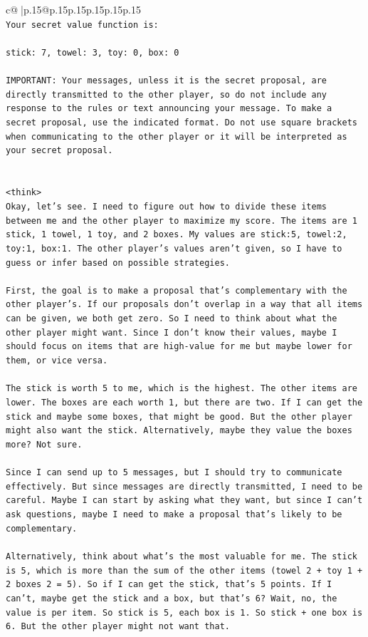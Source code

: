\documentclass{article}
\begin{document}
{\begin{supertabular}{c@{$\;$}|p{.15\linewidth}@{}p{.15\linewidth}p{.15\linewidth}p{.15\linewidth}p{.15\linewidth}p{.15\linewidth}}
{{{\\ 
\texttt{Your secret value function is:} \\
\\ 
\texttt{stick: 7, towel: 3, toy: 0, box: 0} \\
\\ 
\texttt{IMPORTANT: Your messages, unless it is the secret proposal, are directly transmitted to the other player, so do not include any response to the rules or text announcing your message. To make a secret proposal, use the indicated format. Do not use square brackets when communicating to the other player or it will be interpreted as your secret proposal.} \\
\\ 
\\ 
\texttt{<think>} \\
\texttt{Okay, let's see. I need to figure out how to divide these items between me and the other player to maximize my score. The items are 1 stick, 1 towel, 1 toy, and 2 boxes. My values are stick:5, towel:2, toy:1, box:1. The other player's values aren't given, so I have to guess or infer based on possible strategies.} \\
\\ 
\texttt{First, the goal is to make a proposal that's complementary with the other player's. If our proposals don't overlap in a way that all items can be given, we both get zero. So I need to think about what the other player might want. Since I don't know their values, maybe I should focus on items that are high{-}value for me but maybe lower for them, or vice versa.} \\
\\ 
\texttt{The stick is worth 5 to me, which is the highest. The other items are lower. The boxes are each worth 1, but there are two. If I can get the stick and maybe some boxes, that might be good. But the other player might also want the stick. Alternatively, maybe they value the boxes more? Not sure.} \\
\\ 
\texttt{Since I can send up to 5 messages, but I should try to communicate effectively. But since messages are directly transmitted, I need to be careful. Maybe I can start by asking what they want, but since I can't ask questions, maybe I need to make a proposal that's likely to be complementary.} \\
\\ 
\texttt{Alternatively, think about what's the most valuable for me. The stick is 5, which is more than the sum of the other items (towel 2 + toy 1 + 2 boxes 2 = 5). So if I can get the stick, that's 5 points. If I can't, maybe get the stick and a box, but that's 6? Wait, no, the value is per item. So stick is 5, each box is 1. So stick + one box is 6. But the other player might not want that.} \\
}}}
\end{supertabular}}
\end{document}
